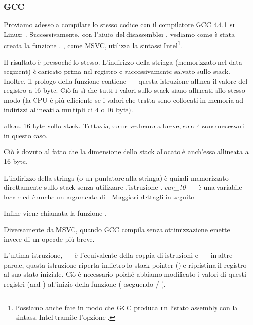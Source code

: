 \subsubsection{GCC}

Proviamo adesso a compilare lo stesso codice \CCpp con il compilatore GCC 4.4.1 su Linux: .
Successivamente, con l'aiuto del disassembler \IDA, vediamo come è stata creata la funzione \main .
\IDA, come MSVC, utilizza la sintassi Intel\footnote{Possiamo anche fare in modo che GCC produca un listato assembly con la sintassi Intel tramite l'opzione .}.



Il risultato è pressoché lo stesso.
L'indirizzo della stringa  (memorizzato nel data segment) è caricato prima nel registro \EAX e successivamente salvato sullo stack.
Inoltre, il prologo della funzione contiene ~---questa
istruzione allinea il valore del registro \ESP a 16-byte.
Ciò fa sì che tutti i valori sullo stack siano allineati allo stesso modo (la CPU è più efficiente se i valori che tratta sono collocati in memoria ad indirizzi allineati a multipli di 4 o 16 byte).

 alloca 16 byte sullo stack. Tuttavia, come vedremo a breve, solo 4 sono necessari in questo caso.

Ciò è dovuto al fatto che la dimensione dello stack allocato è anch'essa allineata a 16 byte.

L'indirizzo della stringa (o un puntatore alla stringa) è quindi memorizzato direttamente sullo stack senza utilizzare l'istruzione \PUSH .
\emph{var\_10}~--- è una variabile locale ed è anche un argomento di \printf{}.
Maggiori dettagli in seguito.

Infine viene chiamata la funzione \printf.

Diversamente da MSVC, quando GCC compila senza ottimizzazione emette  invece di un opcode più breve.

L'ultima istruzione, \LEAVE~---è l'equivalente della coppia di istruzioni  e  ~---in altre parole, questa istruzione riporta indietro lo \gls{stack pointer} (\ESP) e ripristina il registro \EBP al suo stato iniziale.
Ciò è necessario poiché abbiamo modificato i valori di questi registri (\ESP and \EBP) all'inizio della funzione ( eseguendo  / ).

